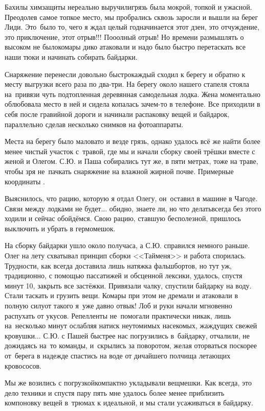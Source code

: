 Бахилы химзащиты нереально выручили\mdash грязь была мокрой, топкой и ужасной. Преодолев самое топкое место, мы пробрались сквозь заросли и вышли на берег Лиди. Это~было то, чего я ждал целый год\mdash начинается этот дзен, это отчуждение, это приключение, этот отрыв!!! По\sdash о\sdash олный отрыв! Но времени размышлять о высоком не было\mdash комары дико атаковали и надо было быстро перетаскать все наши тюки и начинать собирать байдарки. 

Снаряжение перенесли довольно быстро\mdash каждый сходил к берегу и обратно к месту выгрузки всего раза по два-три. На берегу около нашего стапеля стояла на~привязи чуть подтопленная деревянная самодельная лодка. Жена моментально облюбовала место в ней и сидела копалась зачем-то в телефоне. Все приходили в себя после гравийной дороги и начинали распаковку вещей и байдарок, параллельно сделав несколько снимков на фотоаппараты. 

Места на берегу было маловато и везде грязь, однако удалось всё же найти более менее чистый участок с~травой, где мы и начали сборку своей трёшки вместе с женой и Олегом. С.Ю. и Паша собирались тут же, в пяти метрах, тоже на траве, чтобы зря не~пачкать снаряжение на влажной жирной почве. Примерные координаты \CoordsLidSeventeenStapel.

Выяснилось, что рацию, которую я отдал Олегу, он~оставил в машине в Чагоде. Связи между лодками не будет$\ldots$ обидно, знаете ли, но что делать\mdash всегда без этого ходили и сейчас обойдёмся. Свою рацию, ставшую бесполезной, пришлось выключить и убрать в гермомешок.

На сборку байдарки ушло около получаса, а С.Ю. справился немного раньше. Олег на лету схватывал принцип сборки <<Тайменя>> и работа спорилась. Трудности, как всегда доставила лишь натяжка фальшбортов, но тут уж, традиционно, с помощью пассатижей и обсценной лексики, удалось, спустя минут 10, закрыть все застёжки. Привязали чалку, спустили байдарку на воду. Стали таскать и грузить вещи. Комары при этом не дремали и атаковали в полную силу\mdash от такого я~уже давно отвык! Лоб и руки начали мгновенно распухать от укусов. Репелленты не~помогали практически никак, лишь на~несколько минут ослабляя натиск неутомимых насекомых, жаждущих свежей кровушки$\ldots$ С.Ю. с Пашей быстрее нас погрузились в~байдарку, отчалили, не дожидаясь на~то команды, и~скрылись за поворотом, желая оторваться поскорее от~берега в надежде спастись на воде от дичайшего полчища летающих кровососов.

Мы же возились с погрузкой\mdash компактно укладывали вещмешки. Как всегда, это дело техники и спустя пару пять мне удалось более менее приблизить компоновку вещей в~трюмах к идеальной, и мы стали усаживаться в байдарку. 

